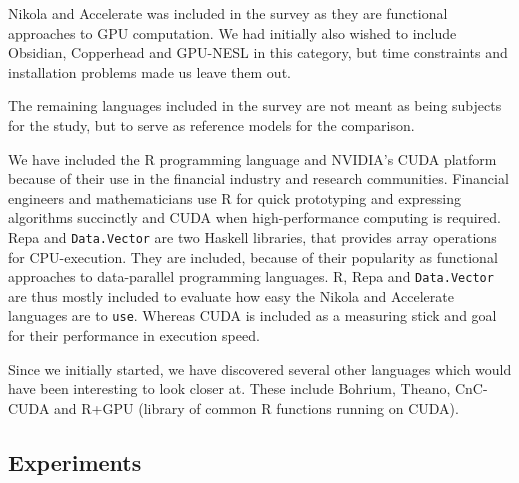 Nikola and Accelerate was included in the survey as they are
functional approaches to GPU computation. We had initially also wished
to include Obsidian\cite{svensson2011obsidian},
Copperhead\cite{Catanzaro2011} and GPU-NESL\cite{bergstrom2012nested}
in this category, but time constraints and installation problems made
us leave them out.

The remaining languages included in the survey are not meant as being
subjects for the study, but to serve as reference models for the
comparison.

We have included the R programming language and NVIDIA's CUDA platform
because of their use in the financial industry and research
communities. Financial engineers and mathematicians use R for quick
prototyping and expressing algorithms succinctly and CUDA when
high-performance computing is required. Repa and \texttt{Data.Vector}
are two Haskell libraries, that provides array operations for
CPU-execution. They are included, because of their popularity as
functional approaches to data-parallel programming languages. R, Repa
and \texttt{Data.Vector} are thus mostly included to evaluate how easy
the Nikola and Accelerate languages are to \texttt{use}. Whereas CUDA
is included as a measuring stick and goal for their performance in
execution speed.

Since we initially started, we have discovered several other languages
which would have been interesting to look closer at. These include
Bohrium\cite{homepage:bohrium}, Theano\cite{bergstra2010theano},
CnC-CUDA\cite{grossman2011cnc} and R+GPU\cite{homepage:rgpu} (library
of common R functions running on CUDA).

\subsection{Experiments} %
%
%


